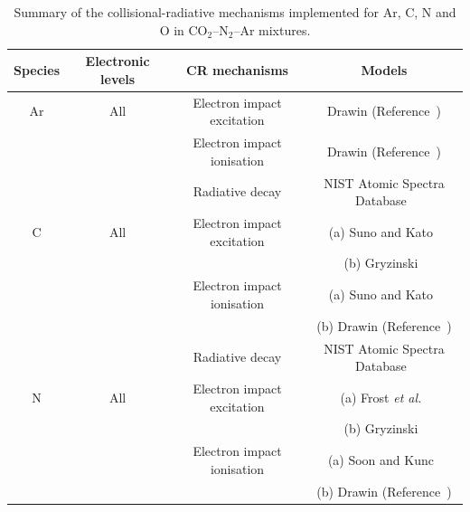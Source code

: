 {\begin{table}[bht]
 \center
 \caption{Summary of the collisional-radiative mechanisms implemented for Ar, C, N and O in CO$_2$--N$_2$--Ar mixtures.}
 \label{tab:Ar-C-N-O-CR}
 \begin{tabular*}{1.0\textwidth}{cccc}
  \hline Species                         & Electronic levels & CR mechanisms                                & Models    \\
  \hline  
                  Ar                               & All & Electron impact excitation                & Drawin (Reference~\cite{panesi_phd}) \\
                                                     &       & Electron impact ionisation               &  Drawin (Reference~\cite{panesi_phd}) \\
                                                     &       & Radiative decay                                 & NIST Atomic Spectra Database~\cite{NIST_ASD} \\
                  C                                & All & Electron impact excitation                & (a) Suno and Kato~\cite{SK2006} \\
                                                     &       &                                                               & (b) Gryzinski~\cite{Gryz59} \\
                                                     &       & Electron impact ionisation               & (a) Suno and Kato~\cite{SK2006} \\
                                                     &       &                                                               & (b) Drawin (Reference~\cite{panesi_phd}) \\
                                                     &       & Radiative decay                                 & NIST Atomic Spectra Database~\cite{NIST_ASD} \\    
                  N                                & All & Electron impact excitation                & (a) Frost \textit{et al.}~\cite{FAS+1998} \\
                                                     &       &                                                               & (b) Gryzinski~\cite{Gryz59} \\
                                                     &       & Electron impact ionisation               & (a) Soon and Kunc~\cite{SK1990} \\
                                                     &       &                                                               & (b) Drawin (Reference~\cite{panesi_phd}) \\

\end{tabular*}
\end{table}}
